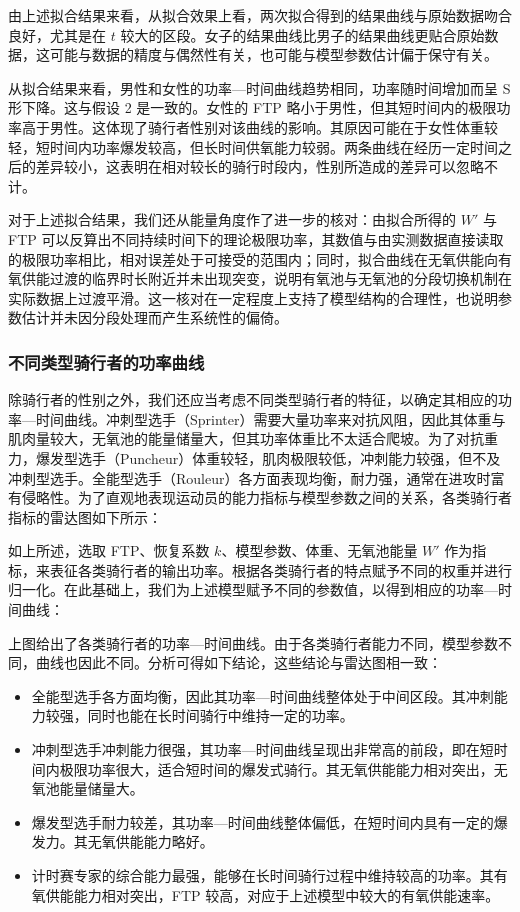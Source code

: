 \documentclass[11pt,a4paper]{ctexart}
\begin{document}
由上述拟合结果来看，从拟合效果上看，两次拟合得到的结果曲线与原始数据吻合良好，尤其是在 $t$ 较大的区段。女子的结果曲线比男子的结果曲线更贴合原始数据，这可能与数据的精度与偶然性有关，也可能与模型参数估计偏于保守有关。

从拟合结果来看，男性和女性的功率—时间曲线趋势相同，功率随时间增加而呈 S 形下降。这与假设 2 是一致的。女性的 FTP 略小于男性，但其短时间内的极限功率高于男性。这体现了骑行者性别对该曲线的影响。其原因可能在于女性体重较轻，短时间内功率爆发较高，但长时间供氧能力较弱。两条曲线在经历一定时间之后的差异较小，这表明在相对较长的骑行时段内，性别所造成的差异可以忽略不计。

对于上述拟合结果，我们还从能量角度作了进一步的核对：由拟合所得的 $W'$ 与 FTP 可以反算出不同持续时间下的理论极限功率，其数值与由实测数据直接读取的极限功率相比，相对误差处于可接受的范围内；同时，拟合曲线在无氧供能向有氧供能过渡的临界时长附近并未出现突变，说明有氧池与无氧池的分段切换机制在实际数据上过渡平滑。这一核对在一定程度上支持了模型结构的合理性，也说明参数估计并未因分段处理而产生系统性的偏倚。

\subsubsection{不同类型骑行者的功率曲线}

除骑行者的性别之外，我们还应当考虑不同类型骑行者的特征，以确定其相应的功率—时间曲线。冲刺型选手（Sprinter）需要大量功率来对抗风阻，因此其体重与肌肉量较大，无氧池的能量储量大，但其功率体重比不太适合爬坡。为了对抗重力，爆发型选手（Puncheur）体重较轻，肌肉极限较低，冲刺能力较强，但不及冲刺型选手。全能型选手（Rouleur）各方面表现均衡，耐力强，通常在进攻时富有侵略性。为了直观地表现运动员的能力指标与模型参数之间的关系，各类骑行者指标的雷达图如下所示：

如上所述，选取 FTP、恢复系数 $k$、模型参数、体重、无氧池能量 $W'$ 作为指标，来表征各类骑行者的输出功率。根据各类骑行者的特点赋予不同的权重并进行归一化。在此基础上，我们为上述模型赋予不同的参数值，以得到相应的功率—时间曲线：

上图给出了各类骑行者的功率—时间曲线。由于各类骑行者能力不同，模型参数不同，曲线也因此不同。分析可得如下结论，这些结论与雷达图相一致：

\begin{itemize}
\item 全能型选手各方面均衡，因此其功率—时间曲线整体处于中间区段。其冲刺能力较强，同时也能在长时间骑行中维持一定的功率。
\item 冲刺型选手冲刺能力很强，其功率—时间曲线呈现出非常高的前段，即在短时间内极限功率很大，适合短时间的爆发式骑行。其无氧供能能力相对突出，无氧池能量储量大。
\item 爆发型选手耐力较差，其功率—时间曲线整体偏低，在短时间内具有一定的爆发力。其无氧供能能力略好。
\item 计时赛专家的综合能力最强，能够在长时间骑行过程中维持较高的功率。其有氧供能能力相对突出，FTP 较高，对应于上述模型中较大的有氧供能速率。
\end{itemize}
\end{document}
